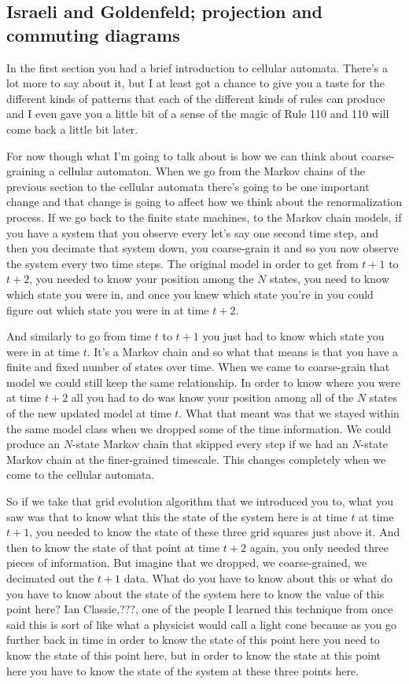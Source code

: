\documentclass[]{article}
\begin{document}
\subsection{Israeli and Goldenfeld; projection and commuting diagrams }

In the first section you had a brief introduction to cellular automata. There's a lot more to say about it, but I at least got a chance to give you a taste for the different kinds of patterns that each of the different kinds of rules can produce and I even gave you a little bit of a sense of the magic of Rule 110 and 110 will come back a little bit later.

For now though what I'm going to talk about is how we can think about coarse-graining a cellular automaton.
When we go from the Markov chains of the previous section to the cellular automata  there's going to be one important change and that change is going to affect how we think about the renormalization process. If we go back to the finite state machines, to the Markov chain models, if you have a system that you observe every let's say one second time step, and then you decimate that system down,
you coarse-grain it and so you now observe the system every two time steps. 
The original model in order to get from $t+1$ to $t+2$, you needed to know your position among the $N$ states, you need to know which state you were in, and once you knew which state you're in you could figure out which state you were in at time $t+2$.

And similarly to go from time $t$ to $t+1$ you just had to know which state you were in at time $t$. It's a Markov chain and so what that means is that you have a finite and fixed number of states over time. When we came to coarse-grain that model 
we could still keep the same relationship. In order to know where you were at time $t+2$ all you had to do was know your position among all of the $N$ states of the
new updated model at time $t$. What that meant was that we stayed within the same model class when we dropped some of the time information. We could produce an $N$-state Markov chain that skipped every step if we had an $N$-state Markov chain at the finer-grained timescale. This changes completely when we come to the cellular automata.

So if we take that grid evolution algorithm that we introduced you to, what you saw was that to know what this the state of the system here is at time $t$ at time $t+1$,
you needed to know the state of these three grid squares just above it. And then to know the state of that point at time $t+2$ again, you only needed three pieces of information.
But imagine that we dropped, we coarse-grained, we decimated out the $t+1$ data.
What do you have to know about this or what do you have to know about the state of the system here to know the value of this point here? Ian Classie,???, one of the people I learned this technique from once said this is sort of like what a physicist would call a light cone because as you go further back in time in order to know the state of this point here you need to know the state of this point here, but in order to know the state at this point here you have to know the state of the system at 
these three points here.
\end{document}
